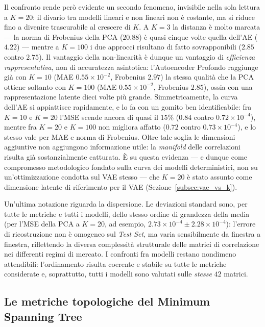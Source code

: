 Il confronto rende però evidente un secondo fenomeno, invisibile nella sola lettura a $K=20$: il divario tra modelli lineari e non lineari non è costante, ma si riduce fino a divenire trascurabile al crescere di $K$. A $K=3$ la distanza è molto marcata --- la norma di Frobenius della PCA ($20.88$) è quasi cinque volte quella dell'AE ($4.22$) --- mentre a $K=100$ i due approcci risultano di fatto sovrapponibili ($2.85$ contro $2.75$). Il vantaggio della non-linearità è dunque un vantaggio di \emph{efficienza rappresentativa}, non di accuratezza asintotica: l'Autoencoder Profondo raggiunge già con $K=10$ (MAE $0.55\times10^{-2}$, Frobenius $2.97$) la stessa qualità che la PCA ottiene soltanto con $K=100$ (MAE $0.55\times10^{-2}$, Frobenius $2.85$), ossia con una rappresentazione latente dieci volte più grande. Simmetricamente, la curva dell'AE si appiattisce rapidamente, e lo fa con un gomito ben identificabile: fra $K=10$ e $K=20$ l'MSE scende ancora di quasi il $15\%$ ($0.84$ contro $0.72\times10^{-4}$), mentre fra $K=20$ e $K=100$ non migliora affatto ($0.72$ contro $0.73\times10^{-4}$), e lo stesso vale per MAE e norma di Frobenius. Oltre tale soglia le dimensioni aggiuntive non aggiungono informazione utile: la \emph{manifold} delle correlazioni risulta già sostanzialmente catturata. È su questa evidenza --- e dunque come compromesso metodologico fondato sulla curva dei modelli deterministici, non su un'ottimizzazione condotta sul VAE stesso --- che $K=20$ è stato assunto come dimensione latente di riferimento per il VAE (Sezione~\ref{subsec:vae_vs_k}).

Un'ultima notazione riguarda la dispersione. Le deviazioni standard sono, per tutte le metriche e tutti i modelli, dello stesso ordine di grandezza della media (per l'MSE della PCA a $K=20$, ad esempio, $2.73\times10^{-4} \pm 2.28\times10^{-4}$): l'errore di ricostruzione non è omogeneo sul \emph{Test Set}, ma varia sensibilmente da finestra a finestra, riflettendo la diversa complessità strutturale delle matrici di correlazione nei differenti regimi di mercato. I confronti fra modelli restano nondimeno attendibili: l'ordinamento risulta coerente e stabile su tutte le metriche considerate e, soprattutto, tutti i modelli sono valutati sulle \emph{stesse} $42$ matrici.

\subsection{Le metriche topologiche del Minimum Spanning Tree}
\label{subsec:metriche_mst}

